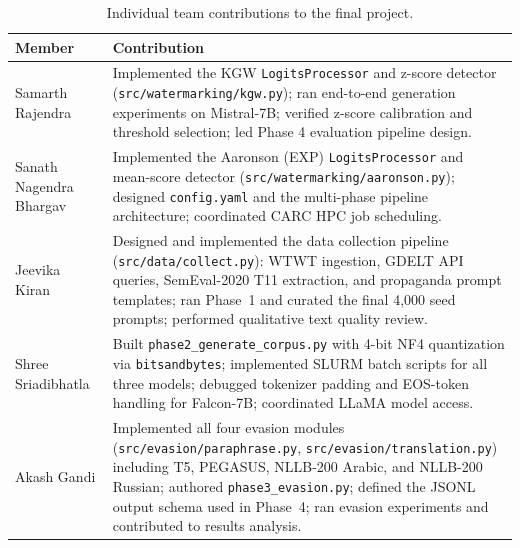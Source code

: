 \documentclass[11pt]{article}
\begin{document}
\begin{table}[h]
\centering
\small
\begin{tabular}{@{}lp{5.6cm}@{}}
\toprule
\textbf{Member} & \textbf{Contribution} \\
\midrule
Samarth Rajendra
  & Implemented the KGW \texttt{LogitsProcessor} and z-score detector
    (\texttt{src/watermarking/kgw.py}); ran end-to-end generation experiments
    on Mistral-7B; verified z-score calibration and threshold selection;
    led Phase 4 evaluation pipeline design. \\[4pt]
Sanath Nagendra Bhargav
  & Implemented the Aaronson (EXP) \texttt{LogitsProcessor} and mean-score
    detector (\texttt{src/watermarking/aaronson.py}); designed
    \texttt{config.yaml} and the multi-phase pipeline architecture;
    coordinated CARC HPC job scheduling. \\[4pt]
Jeevika Kiran
  & Designed and implemented the data collection pipeline
    (\texttt{src/data/collect.py}): WTWT ingestion, GDELT API queries,
    SemEval-2020 T11 extraction, and propaganda prompt templates;
    ran Phase~1 and curated the final 4{,}000 seed prompts;
    performed qualitative text quality review. \\[4pt]
Shree Sriadibhatla
  & Built \texttt{phase2\_generate\_corpus.py} with 4-bit NF4 quantization
    via \texttt{bitsandbytes}; implemented SLURM batch scripts for all
    three models; debugged tokenizer padding and EOS-token handling
    for Falcon-7B; coordinated LLaMA model access. \\[4pt]
Akash Gandi
  & Implemented all four evasion modules (\texttt{src/evasion/paraphrase.py},
    \texttt{src/evasion/translation.py}) including T5, PEGASUS, NLLB-200
    Arabic, and NLLB-200 Russian; authored \texttt{phase3\_evasion.py};
    defined the JSONL output schema used in Phase~4; ran evasion experiments
    and contributed to results analysis. \\
\bottomrule
\end{tabular}
\caption{Individual team contributions to the final project.}
\label{tab:contributions}
\end{table}
\end{document}
